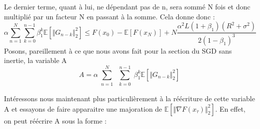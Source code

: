 \documentclass{article}
\begin{document}
Le dernier terme, quant à lui, ne dépendant pas de n, sera sommé N fois et donc multiplié par un facteur N en passant à la somme. Cela donne donc :
\begin{equation}
    \alpha \sum_{n=1}^{N} \sum_{k=0}^{n-1} \beta_1^k \mathbb{E}[ \Vert G_{n-k} \Vert ^2_2] \leq F(x_0)-\mathbb{E}[F(x_N)]+ N \frac{\alpha^2 L (1+\beta_1)(R^2+\sigma^2)}{2(1-\beta_1)^3}
    \label{eq:B23}
\end{equation} 
Posons, pareillement à ce que nous avons fait pour la section du SGD sans inertie, la variable A
\begin{equation*}
    A=\alpha \sum\limits_{\substack{n=1}}^{N} \sum\limits_{\substack{k=0}}^{n-1} \beta_1^k \mathbb{E}[ \Vert G_{n-k} \Vert ^2_2]
\end{equation*}

\bigskip

Intéressons nous maintenant plus particulièrement à la réécriture de cette variable A et essayons de faire apparaitre une majoration de $\mathbb{E}[\Vert \nabla F(x_\tau) \Vert _2^2]$.
En effet, on peut réécrire A sous la forme :
\end{document}
